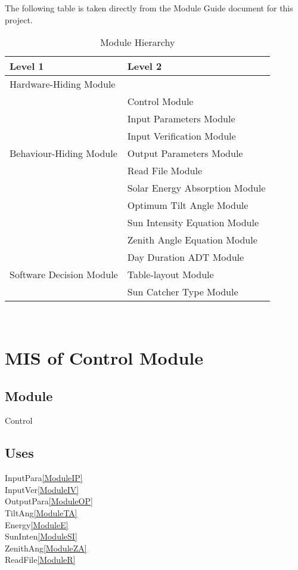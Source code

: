\documentclass[12pt, titlepage]{article}
\begin{document}
The following table is taken directly from the Module Guide document for this
project.

\begin{table}[h!]
\centering
\begin{tabular}{p{} p{}}
\toprule
\textbf{Level 1} & \textbf{Level 2}\\
\midrule

{Hardware-Hiding Module} & ~ \\
\midrule

\multirow{7}{0.3\textwidth}{Behaviour-Hiding
 Module}& Control Module\\
& Input Parameters Module\\
& Input Verification Module\\
& Output Parameters Module\\
& Read File Module\\
& Solar Energy Absorption Module\\
& Optimum Tilt Angle Module\\
& Sun Intensity Equation Module\\
& Zenith Angle Equation Module\\
\midrule

\multirow{3}{0.3\textwidth}{Software Decision Module} 
& Day Duration ADT Module\\
& Table-layout Module\\
& Sun Catcher Type 
Module\\
\bottomrule

\end{tabular}
\caption{Module Hierarchy}
\label{TblMH}
\end{table}

\newpage
~\newpage


\section{MIS of Control Module} \label{ModuleC} 

\subsection{Module}
Control

\subsection{Uses}
InputPara\ref{ModuleIP} \\
InputVer\ref{ModuleIV}\\
OutputPara\ref{ModuleOP}\\
TiltAng\ref{ModuleTA}\\
Energy\ref{ModuleE}\\
SunInten\ref{ModuleSI}\\
ZenithAng\ref{ModuleZA}\\
ReadFile\ref{ModuleR}
\end{document}
